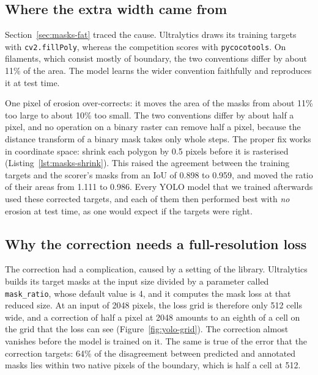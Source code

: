 \subsection{Where the extra width came from}\label{sec:yolo-fat-cause}
Section~\ref{sec:masks-fat} traced the cause. Ultralytics draws its training targets with
\texttt{cv2.fillPoly}, whereas the competition scores with \texttt{pycocotools}. On filaments, which
consist mostly of boundary, the two conventions differ by about 11\% of the area. The model learns
the wider convention faithfully and reproduces it at test time.

One pixel of erosion over-corrects: it moves the area of the masks from about 11\% too large to
about 10\% too small. The two conventions differ by about half a pixel, and no operation on a binary
raster can remove half a pixel, because the distance transform of a binary mask takes only whole
steps. The proper fix works in coordinate space: shrink each polygon by 0.5 pixels before it is
rasterised (Listing~\ref{lst:masks-shrink}). This raised the agreement between the training targets
and the scorer's masks from an IoU of 0.898 to 0.959, and moved the ratio of their areas from 1.111
to 0.986. Every YOLO model that we trained afterwards used these corrected targets, and each of them
then performed best with \emph{no} erosion at test time, as one would expect if the targets were
right.

\subsection{Why the correction needs a full-resolution loss}\label{sec:yolo-maskratio}
The correction had a complication, caused by a setting of the library. Ultralytics builds its target
masks at the input size divided by a parameter called \texttt{mask\_ratio}, whose default value is 4,
and it computes the mask loss at that reduced size. At an input of 2048 pixels, the loss grid is
therefore only 512 cells wide, and a correction of half a pixel at 2048 amounts to an eighth of a
cell on the grid that the loss can see (Figure~\ref{fig:yolo-grid}). The correction almost vanishes
before the model is trained on it. The same is true of the error that the correction targets: 64\%
of the disagreement between predicted and annotated masks lies within two native pixels of the
boundary, which is half a cell at 512.


